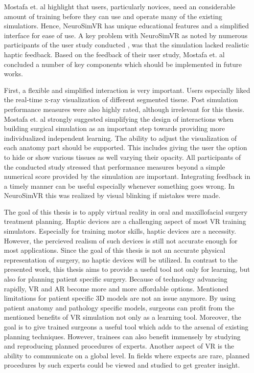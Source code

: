 Mostafa et. al highlight that users, particularly novices, need an considerable amount of training before they can use and operate many of the existing simulatiors.
Hence, NeuroSimVR has unique educational features and a simplified interface for ease of use.
A key problem with NeuroSimVR as noted by numerous participants of the user study conducted \cite{RN71}, was that the simulation lacked realistic haptic feedback. 
Based on the feedback of their user study, Mostafa et. al concluded a number of key components which should be implemented in future works.

First, a flexible and simplified interaction is very important.
Users especially liked the real-time x-ray visualization of different segmented tissue.
Post simulation performance measures were also highly rated, although irrelevant for this thesis.
Mostafa et. al strongly suggested simplifying the design of interactions when building surgical simulation as an important step towards providing more individualized independent learning.
The ability to adjust the visualization of each anatomy part should be supported.
This includes giving the user the option to hide or show various tissues as well varying their opacity.
All participants of the conducted study stressed that performance measures beyond a simple numerical score provided by the simulation are important.
Integrating feedback in a timely manner can be useful especially whenever something goes wrong.
In NeuroSimVR this was realized by visual blinking if mistakes were made.

The goal of this thesis is to apply virtual reality in oral and maxillofacial surgery treatment planning.
Haptic devices are a challenging aspect of most VR training simulators.
Especially for training motor skills, haptic devices are a necessity.
However, the percieved realism of such devices is still not accurate enough for most applications.
Since the goal of this thesis is not an accurate physical representation of surgery, no haptic devices will be utilized.
In contrast to the presented work, this thesis aims to provide a useful tool not only for learning, but also for planning patient specific surgery.
Because of technology advancing rapidly, VR and AR become more and more affordable options.
Mentioned limitations for patient specific 3D models are not an issue anymore.
By using patient anatomy and pathology specific models, surgeons can profit from the mentioned benefits of VR simulation not only as a learning tool.
Moreover, the goal is to give trained surgeons a useful tool which adds to the arsenal of existing planning techniques.
However, trainees can also benefit immensely by studying and reproducing planned procedures of experts.
Another aspect of VR is the ability to communicate on a global level. 
In fields where expects are rare, planned procedures by such experts could be viewed and studied to get greater insight.
